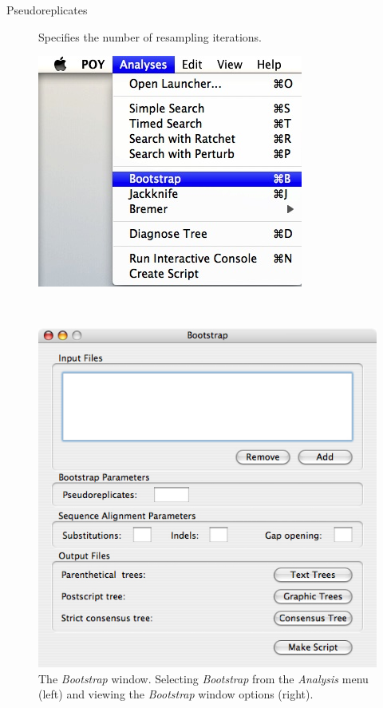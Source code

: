 {\begin{description}
    \item[Pseudoreplicates] Specifies the number of resampling iterations.
\end{description}

\begin{figure}
\centering
\begin{minipage}[c]{0.45\textwidth}
   		\includegraphics[width=\textwidth]{doc/figures/bootstrap_menu.jpg}
\end{minipage}
\,
\begin{minipage}[c]{0.52\textwidth}
	   	\includegraphics[width=\textwidth]{doc/figures/bootstrap_window.jpg}
   	\end{minipage}
\caption{The \emph{Bootstrap} window. Selecting \emph{Bootstrap} from the \emph{Analysis} menu (left) and 
viewing the \emph{Bootstrap} window options (right).}
\label{fig:bootstrap}
\end{figure}

}
